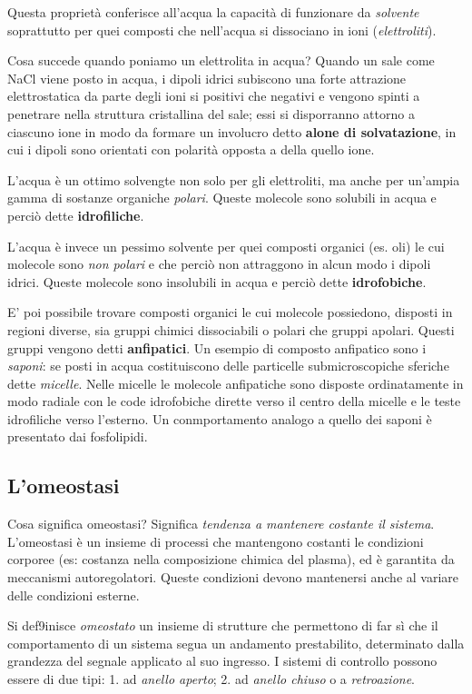 \documentclass[]{article}
\begin{document}
Questa proprietà conferisce all'acqua la capacità di funzionare da
\emph{solvente} soprattutto per quei composti che nell'acqua si
dissociano in ioni (\emph{elettroliti}).

Cosa succede quando poniamo un elettrolita in acqua? Quando un sale come
NaCl viene posto in acqua, i dipoli idrici subiscono una forte
attrazione elettrostatica da parte degli ioni si positivi che negativi e
vengono spinti a penetrare nella struttura cristallina del sale; essi si
disporranno attorno a ciascuno ione in modo da formare un involucro
detto \textbf{alone di solvatazione}, in cui i dipoli sono orientati con
polarità opposta a della quello ione.

L'acqua è un ottimo solvengte non solo per gli elettroliti, ma anche per
un'ampia gamma di sostanze organiche \emph{polari}. Queste molecole sono
solubili in acqua e perciò dette \textbf{idrofiliche}.

L'acqua è invece un pessimo solvente per quei composti organici (es.
oli) le cui molecole sono \emph{non polari} e che perciò non attraggono
in alcun modo i dipoli idrici. Queste molecole sono insolubili in acqua
e perciò dette \textbf{idrofobiche}.

E' poi possibile trovare composti organici le cui molecole possiedono,
disposti in regioni diverse, sia gruppi chimici dissociabili o polari
che gruppi apolari. Questi gruppi vengono detti \textbf{anfipatici}. Un
esempio di composto anfipatico sono i \emph{saponi}: se posti in acqua
costituiscono delle particelle submicroscopiche sferiche dette
\emph{micelle}. Nelle micelle le molecole anfipatiche sono disposte
ordinatamente in modo radiale con le code idrofobiche dirette verso il
centro della micelle e le teste idrofiliche verso l'esterno. Un
conmportamento analogo a quello dei saponi è presentato dai fosfolipidi.

\subsection{L'omeostasi}\label{lomeostasi}

Cosa significa omeostasi? Significa \emph{tendenza a mantenere costante
il sistema}. L'omeostasi è un insieme di processi che mantengono
costanti le condizioni corporee (es: costanza nella composizione chimica
del plasma), ed è garantita da meccanismi autoregolatori. Queste
condizioni devono mantenersi anche al variare delle condizioni esterne.

Si def9inisce \emph{omeostato} un insieme di strutture che permettono di
far sì che il comportamento di un sistema segua un andamento
prestabilito, determinato dalla grandezza del segnale applicato al suo
ingresso. I sistemi di controllo possono essere di due tipi: 1. ad
\emph{anello aperto}; 2. ad \emph{anello chiuso} o a \emph{retroazione}.
\end{document}
